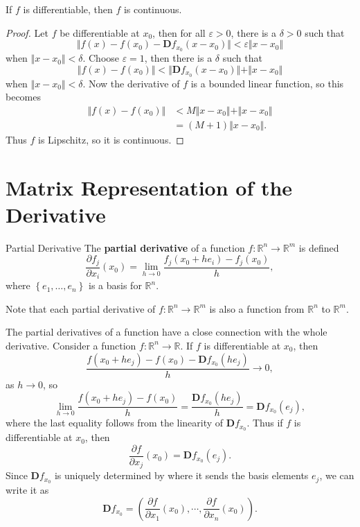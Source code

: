 \documentclass[10pt]{report}
\begin{document}
\begin{prop}
	If $f$ is differentiable, then $f$ is continuous.
\end{prop}
\begin{proof}
	Let $f$ be differentiable at $x_0$, then for all $\varepsilon > 0$, there is a $\delta > 0$ such that
	\[
		\Vert{f(x) - f(x_0) - \mathbf{D}f_{x_0}(x-x_0)}\Vert < \varepsilon \Vert{x-x_0}\Vert
	\] when $\Vert{x-x_0}\Vert< \delta$. Choose $\varepsilon = 1$, then there is a $\delta$ such that
	\[
		\Vert{f(x) - f(x_0)}\Vert < \Vert{\mathbf{D}f_{x_0}(x-x_0)}\Vert+ \Vert{x-x_0}\Vert
	\] when $\Vert{x-x_0}\Vert< \delta$. Now the derivative of $f$ is a bounded linear function, so this becomes
	\begin{align*}
		\Vert{f(x) - f(x_0)}\Vert &< M \Vert{x-x_0}\Vert+ \Vert{x-x_0}\Vert \\
					  &= (M+1) \Vert{x-x_0}\Vert.
	\end{align*}
	Thus $f$ is Lipschitz, so it is continuous.
\end{proof}



\section{Matrix Representation of the Derivative}

\begin{defn}{Partial Derivative}{}
The \textbf{partial derivative} of a function $f:\mathbb{R}^n \to \mathbb{R}^m$ is defined
\[
	\frac{\partial f_j}{\partial x_i} (x_0) = \lim_{h \to 0} \frac{f_j(x_0 + h e_i) - f_j(x_0)}{h},
\] where $\left\{ e_1, \dots, e_n \right\}$ is a basis for $\mathbb{R}^n$.
\end{defn}

Note that each partial derivative of $f: \mathbb{R}^n \to \mathbb{R}^m$ is also a function from $\mathbb{R}^n$ to $\mathbb{R}^m$.

The partial derivatives of a function have a close connection with the whole derivative. Consider a function $f: \mathbb{R}^n \to \mathbb{R}$. If $f$ is differentiable at $x_0$, then
\[
	\frac{f(x_0+he_j) - f(x_0) - \mathbf{D}f_{x_0}(he_j)}{h} \to 0,
\] as $h \to 0$, so
\[
	\lim_{h \to 0} \frac{f(x_0+he_j) - f(x_0)}{h} = \frac{\mathbf{D}f_{x_0}(he_j)}{h} = \mathbf{D}f_{x_0}(e_j),
\] where the last equality follows from the linearity of $\mathbf{D}f_{x_0}$. Thus if $f$ is differentiable at $x_0$, then
\[
	\frac{\partial f}{\partial x_j}(x_0) = \mathbf{D}f_{x_0}(e_j).
\] Since $\mathbf{D}f_{x_0}$ is uniquely determined by where it sends the basis elements $e_j$, we can write it as
\[
	\mathbf{D}f_{x_0} = \left( \frac{\partial f}{\partial x_1} (x_0), \cdots, \frac{\partial f}{\partial x_n} (x_0) \right).
\] 
\end{document}
